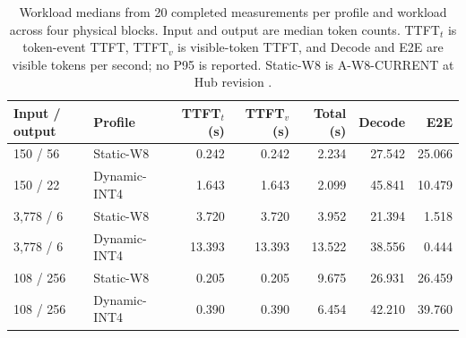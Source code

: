 \begin{table}[H]
\centering
\small
\setlength{\tabcolsep}{4pt}
\setlength{\tabcolsep}{3pt}
\begin{tabular}{@{}llrrrrr@{}}
\toprule
Input / output & Profile & TTFT$_t$ (s) & TTFT$_v$ (s) & Total (s) & Decode & E2E \\
\midrule
150 / 56 & Static-W8 & 0.242 & 0.242 & 2.234 & 27.542 & 25.066 \\
150 / 22 & Dynamic-INT4 & 1.643 & 1.643 & 2.099 & 45.841 & 10.479 \\
3,778 / 6 & Static-W8 & 3.720 & 3.720 & 3.952 & 21.394 & 1.518 \\
3,778 / 6 & Dynamic-INT4 & 13.393 & 13.393 & 13.522 & 38.556 & 0.444 \\
108 / 256 & Static-W8 & 0.205 & 0.205 & 9.675 & 26.931 & 26.459 \\
108 / 256 & Dynamic-INT4 & 0.390 & 0.390 & 6.454 & 42.210 & 39.760 \\
\bottomrule
\end{tabular}
\caption{Workload medians from 20 completed measurements per profile and workload across four physical blocks. Input and output are median token counts. TTFT$_t$ is token-event TTFT, TTFT$_v$ is visible-token TTFT, and Decode and E2E are visible tokens per second; no P95 is reported. Static-W8 is A-W8-CURRENT at Hub revision . }
\label{tab:workload-performance}
\end{table}
